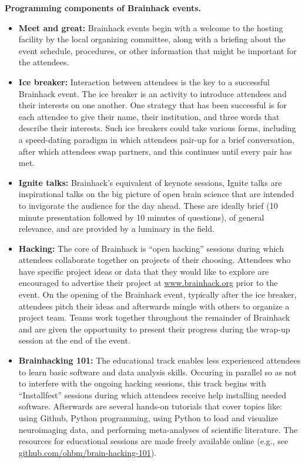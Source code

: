 \documentclass[11pt]{bmc_article_s50}
\begin{document}
\begin{table}[!ht]
\caption{{\bf Programming components of Brainhack events.} }\label{tab4}
\hline
    \begin{itemize}
    \item
        \textbf{Meet and great:} Brainhack events begin with a welcome to the hosting facility by the local organizing committee, along with a briefing about the event schedule, procedures, or other information that might be important for the attendees.
    \item
        \textbf{Ice breaker:} Interaction between attendees is the key to a successful Brainhack event. The ice breaker is an activity to introduce attendees and their interests on one another. One strategy that has been successful is for each attendee to give their name, their institution, and three words that describe their interests. Such ice breakers could take various forms, including a speed-dating paradigm in which attendees pair-up for a brief conversation, after which attendees swap partners, and this continues until every pair has met.
    \item
        \textbf{Ignite talks:} Brainhack's equivalent of keynote sessions, Ignite talks are inspirational talks on the big picture of open brain science that are intended to invigorate the audience for the day ahead. These are ideally brief (10 minute presentation followed by 10 minutes of questions), of general relevance, and are provided by a luminary in the field.
    \item
        \textbf{Hacking:} The core of Brainhack is ``open hacking'' sessions during which attendees collaborate together on projects of their choosing. Attendees who have specific project ideas or data that they would like to explore are encouraged to advertise their project at \href{http://www.brainhack.org}{www.brainhack.org} prior to the event. On the opening of the Brainhack event, typically after the ice breaker, attendees pitch their ideas and afterwards mingle with others to organize a project team. Teams work together throughout the remainder of Brainhack and are given the opportunity to present their progress during the wrap-up session at the end of the event.
    \item
        \textbf{Brainhacking 101:} The educational track enables less experienced attendees to learn basic software and data analysis skills. Occuring in parallel so as not to interfere with the ongoing hacking sessions, this track begins with ``Installfest'' sessions during which attendees receive help installing needed software. Afterwards are several hands-on tutorials that cover topics like: using Github, Python programming, using Python to load and visualize neuroimaging data, and performing meta-analyses of scientific literature. The resources for educational sessions are made freely available online (e.g., see \href{https://github.com/ohbm/brain-hacking-101}{github.com/ohbm/brain-hacking-101}).

\end{itemize}
\end{table}
\end{document}
